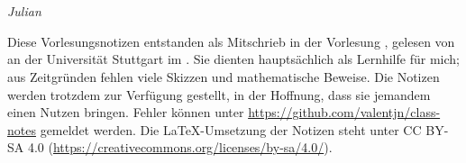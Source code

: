 \part{\vorlesung{}}
\thispagestyle{empty}

\emph{Julian }

\vspace*{1em}

Diese Vorlesungsnotizen entstanden als Mitschrieb in der Vorlesung \vorlesung{},
gelesen von \dozent{} an der Universität Stuttgart im \semester{}.
Sie dienten hauptsächlich als Lernhilfe für mich;
aus Zeitgründen fehlen viele Skizzen und mathematische Beweise.
Die Notizen werden trotzdem zur Verfügung gestellt, in der Hoffnung,
dass sie jemandem einen Nutzen bringen.
Fehler können unter \url{https://github.com/valentjn/class-notes} gemeldet werden.
Die \LaTeX{}-Umsetzung der Notizen steht unter CC BY-SA 4.0
(\url{https://creativecommons.org/licenses/by-sa/4.0/}).

{%
  \renewcommand*{\chaptermarkformat}{}

  \renewcommand*{\contentsname}{Inhaltsverzeichnis dieser Vorlesung}

  \localtableofcontents%
}

\pagebreak
